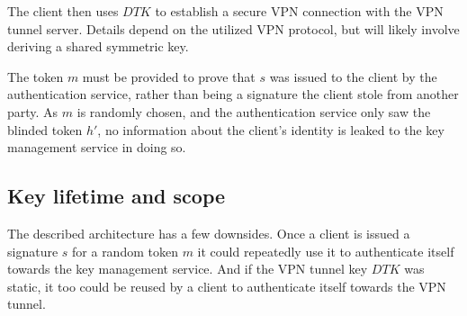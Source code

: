 \documentclass[a4paper]{scrreprt}
\newcommand{\var}[1]{\textit{#1}}
\begin{document}
The client then uses $DTK$ to establish a secure VPN connection with the VPN
tunnel server. Details depend on the utilized VPN protocol, but will likely
involve deriving a shared symmetric key.


\FloatBarrier

The token $m$ must be provided to prove that $s$ was issued to the client by
the authentication service, rather than being a signature the client stole from
another party. As $m$ is randomly chosen, and the authentication service only
saw the blinded token $h'$, no information about the client's identity is leaked
to the key management service in doing so.


\subsection{Key lifetime and scope}

The described architecture has a few downsides. Once a client is issued a
signature $s$ for a random token $m$ it could repeatedly use it to authenticate
itself towards the key management service. And if the VPN tunnel key $DTK$ was
static, it too could be reused by a client to authenticate itself towards the
VPN tunnel.
\end{document}
